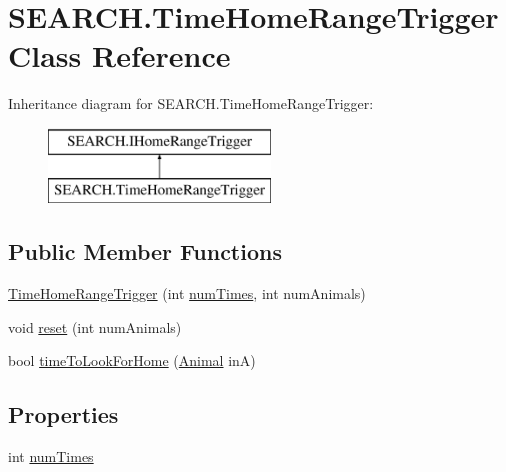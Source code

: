 \hypertarget{class_s_e_a_r_c_h_1_1_time_home_range_trigger}{\section{S\-E\-A\-R\-C\-H.\-Time\-Home\-Range\-Trigger Class Reference}
\label{class_s_e_a_r_c_h_1_1_time_home_range_trigger}
}
Inheritance diagram for S\-E\-A\-R\-C\-H.\-Time\-Home\-Range\-Trigger\-:\begin{figure}[H]
\begin{center}
\leavevmode
\includegraphics[height=2.000000cm]{class_s_e_a_r_c_h_1_1_time_home_range_trigger}
\end{center}
\end{figure}
\subsection*{Public Member Functions}
\begin{DoxyCompactItemize}
\item 
\hyperlink{class_s_e_a_r_c_h_1_1_time_home_range_trigger_ab1c4a4a353c96ddb3c1ef68b7204ba29}{Time\-Home\-Range\-Trigger} (int \hyperlink{class_s_e_a_r_c_h_1_1_time_home_range_trigger_aac2658cafbac6f2827bbf64d69df3481}{num\-Times}, int num\-Animals)
\item 
void \hyperlink{class_s_e_a_r_c_h_1_1_time_home_range_trigger_afd1bace9c699ecf623e4ee72596873e4}{reset} (int num\-Animals)
\item 
bool \hyperlink{class_s_e_a_r_c_h_1_1_time_home_range_trigger_ad480f427e0e81b0331efd1e393b3dd65}{time\-To\-Look\-For\-Home} (\hyperlink{class_s_e_a_r_c_h_1_1_animal}{Animal} in\-A)
\end{DoxyCompactItemize}
\subsection*{Properties}
\begin{DoxyCompactItemize}
\item 
int \hyperlink{class_s_e_a_r_c_h_1_1_time_home_range_trigger_aac2658cafbac6f2827bbf64d69df3481}{num\-Times}
\end{DoxyCompactItemize}


